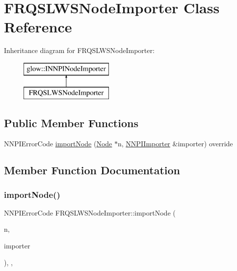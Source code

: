 \hypertarget{class_f_r_q_s_l_w_s_node_importer}{}\section{F\+R\+Q\+S\+L\+W\+S\+Node\+Importer Class Reference}
\label{class_f_r_q_s_l_w_s_node_importer}
Inheritance diagram for F\+R\+Q\+S\+L\+W\+S\+Node\+Importer\+:\begin{figure}[H]
\begin{center}
\leavevmode
\includegraphics[height=2.000000cm]{class_f_r_q_s_l_w_s_node_importer}
\end{center}
\end{figure}
\subsection*{Public Member Functions}
\begin{DoxyCompactItemize}
\item 
N\+N\+P\+I\+Error\+Code \hyperlink{class_f_r_q_s_l_w_s_node_importer_aec090eed1e7a17fadc0869e71cc99d5d}{import\+Node} (\hyperlink{classglow_1_1_node}{Node} $\ast$n, \hyperlink{classglow_1_1_n_n_p_i_importer}{N\+N\+P\+I\+Importer} \&importer) override
\end{DoxyCompactItemize}


\subsection{Member Function Documentation}
\mbox{\label{class_f_r_q_s_l_w_s_node_importer_aec090eed1e7a17fadc0869e71cc99d5d}} 
\subsubsection{\texorpdfstring{import\+Node()}{importNode()}}
{\footnotesize\ttfamily N\+N\+P\+I\+Error\+Code F\+R\+Q\+S\+L\+W\+S\+Node\+Importer\+::import\+Node (\begin{DoxyParamCaption}\item[{\hyperlink{classglow_1_1_node}{Node} $\ast$}]{n,  }\item[{\hyperlink{classglow_1_1_n_n_p_i_importer}{N\+N\+P\+I\+Importer} \&}]{importer }\end{DoxyParamCaption})\hspace{0.3cm}{\ttfamily [inline]}, {\ttfamily [override]}, {\ttfamily [virtual]}}


